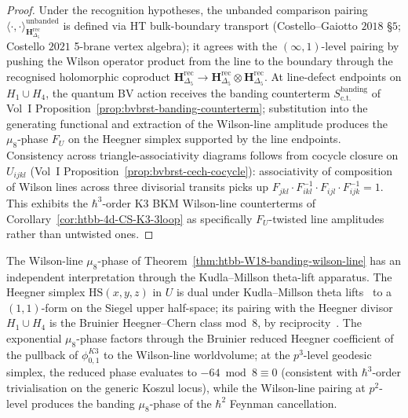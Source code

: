 \begin{proof}
Under the recognition hypotheses, the unbanded comparison pairing
$\langle\cdot,\cdot\rangle^{\mathrm{unbanded}}_{\mathbf{H}_{\Delta_5}^{\mathrm{rec}}}$
is defined via HT bulk-boundary transport
\textup{(}Costello--Gaiotto $2018$ \S$5$; Costello $2021$ 5-brane
vertex algebra\textup{);} it agrees with the $(\infty,1)$-level
pairing by pushing the Wilson operator product from the line to the
boundary through the recognised holomorphic coproduct
$\mathbf{H}_{\Delta_5}^{\mathrm{rec}}\to
\mathbf{H}_{\Delta_5}^{\mathrm{rec}}\otimes
\mathbf{H}_{\Delta_5}^{\mathrm{rec}}$.
At line-defect endpoints on $H_1 \cup H_4$, the quantum BV action
receives the banding counterterm
$S^{\mathrm{banding}}_{\mathrm{c.t.}}$ of Vol~I
Proposition~\ref{prop:bvbrst-banding-counterterm};
substitution into the generating functional and extraction of the
Wilson-line amplitude produces the $\mu_8$-phase $F_U$ on the
Heegner simplex supported by the line endpoints. Consistency across
triangle-associativity diagrams follows from cocycle closure on
$U_{ijkl}$ \textup{(}Vol~I
Proposition~\ref{prop:bvbrst-cech-cocycle}\textup{):}
associativity of composition of Wilson lines across three divisorial
transits picks up
$F_{jkl}\cdot F_{ikl}^{-1}\cdot F_{ijl}\cdot F_{ijk}^{-1} = 1$. This
exhibits the $\hbar^3$-order K3 BKM Wilson-line counterterms of
Corollary~\ref{cor:htbb-4d-CS-K3-3loop} as specifically $F_U$-twisted
line amplitudes rather than untwisted ones.
\end{proof}

\begin{remark}
\label{rem:htbb-mu8-kudla-millson}
The Wilson-line $\mu_8$-phase of
Theorem~\ref{thm:htbb-W18-banding-wilson-line} has an independent
interpretation through the Kudla--Millson theta-lift apparatus. The
Heegner simplex $\mathrm{HS}(x, y, z)$ in $U$ is dual under
Kudla--Millson theta lifts~\cite{KudlaMillson1990} to a $(1,1)$-form
on the Siegel upper half-space; its pairing with the Heegner divisor
$H_1\cup H_4$ is the Bruinier Heegner--Chern class mod~$8$, by
reciprocity~\cite[Proposition 5.1]{Bruinier2002}. The exponential
$\mu_8$-phase factors through the Bruinier reduced Heegner coefficient
of the pullback of \(\phi_{0,1}^{K3}\) to the Wilson-line worldvolume; at the
$p^3$-level geodesic simplex, the reduced phase evaluates to
\(-64 \bmod 8 \equiv 0\) (consistent with $\hbar^3$-order
trivialisation on the generic Koszul locus), while the Wilson-line
pairing at $p^2$-level produces the banding $\mu_8$-phase of the
$\hbar^2$ Feynman cancellation.
\end{remark}

